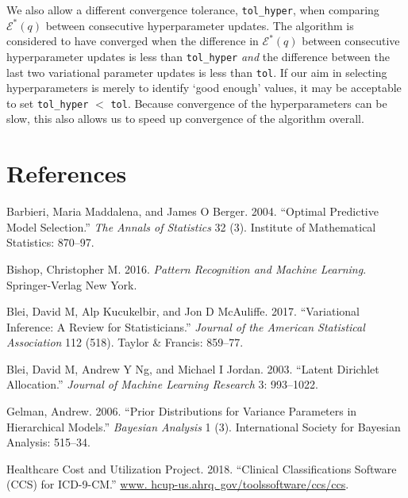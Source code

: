 \documentclass[]{article}
\begin{document}
We also allow a different convergence tolerance, \texttt{tol\_hyper},
when comparing \(\mathcal{E}^*(q)\) between consecutive hyperparameter
updates. The algorithm is considered to have converged when the
difference in \(\mathcal{E}^*(q)\) between consecutive hyperparameter
updates is less than \texttt{tol\_hyper} \emph{and} the difference
between the last two variational parameter updates is less than
\texttt{tol}. If our aim in selecting hyperparameters is merely to
identify `good enough' values, it may be acceptable to set
\texttt{tol\_hyper} \(<\) \texttt{tol}. Because convergence of the
hyperparameters can be slow, this also allows us to speed up convergence
of the algorithm overall.

\hypertarget{references}{%
\section*{References}\label{references}}

\hypertarget{refs}{}
\leavevmode\hypertarget{ref-barbieri2004optimal}{}%
Barbieri, Maria Maddalena, and James O Berger. 2004. ``Optimal
Predictive Model Selection.'' \emph{The Annals of Statistics} 32 (3).
Institute of Mathematical Statistics: 870--97.

\leavevmode\hypertarget{ref-bishop2016pattern}{}%
Bishop, Christopher M. 2016. \emph{Pattern Recognition and Machine
Learning}. Springer-Verlag New York.

\leavevmode\hypertarget{ref-blei2017variational}{}%
Blei, David M, Alp Kucukelbir, and Jon D McAuliffe. 2017. ``Variational
Inference: A Review for Statisticians.'' \emph{Journal of the American
Statistical Association} 112 (518). Taylor \& Francis: 859--77.

\leavevmode\hypertarget{ref-blei2003latent}{}%
Blei, David M, Andrew Y Ng, and Michael I Jordan. 2003. ``Latent
Dirichlet Allocation.'' \emph{Journal of Machine Learning Research} 3:
993--1022.

\leavevmode\hypertarget{ref-gelman2006prior}{}%
Gelman, Andrew. 2006. ``Prior Distributions for Variance Parameters in
Hierarchical Models.'' \emph{Bayesian Analysis} 1 (3). International
Society for Bayesian Analysis: 515--34.

\leavevmode\hypertarget{ref-healthcare2018clinical}{}%
Healthcare Cost and Utilization Project. 2018. ``Clinical
Classifications Software (CCS) for ICD-9-CM.''
\href{www.\%20hcup-us.ahrq.\%20gov/toolssoftware/ccs/ccs}{www. hcup-us.ahrq. gov/toolssoftware/ccs/ccs}.
\end{document}

